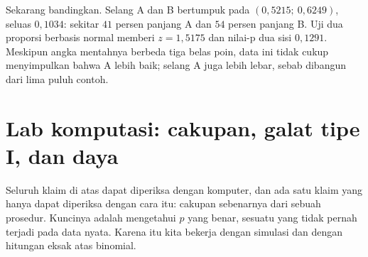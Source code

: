 Sekarang bandingkan. Selang A dan B bertumpuk pada $(0{,}5215;\ 0{,}6249)$, seluas
$0{,}1034$: sekitar $41$ persen panjang A dan $54$ persen panjang B. Uji dua proporsi
berbasis normal memberi $z=1{,}5175$ dan nilai-p dua sisi $0{,}1291$. Meskipun angka
mentahnya berbeda tiga belas poin, data ini tidak cukup menyimpulkan bahwa A lebih
baik; selang A juga lebih lebar, sebab dibangun dari lima puluh contoh.


\section{Lab komputasi: cakupan, galat tipe I, dan daya}

Seluruh klaim di atas dapat diperiksa dengan komputer, dan ada satu klaim yang hanya
dapat diperiksa dengan cara itu: cakupan sebenarnya dari sebuah prosedur. Kuncinya
adalah mengetahui $p$ yang benar, sesuatu yang tidak pernah terjadi pada data nyata.
Karena itu kita bekerja dengan simulasi dan dengan hitungan eksak atas binomial.

